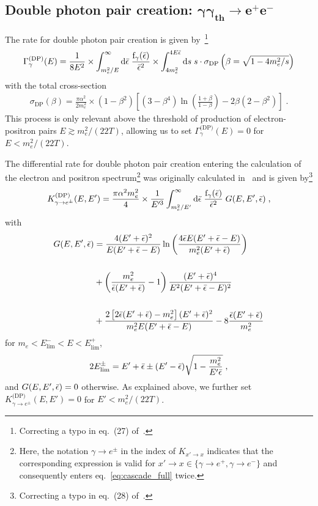 \documentclass[11pt,a4paper]{article}
\newcommand{\fpdi}{\mathrm{f}}
\newcommand{\eqsp}{\;}
\newcommand{\X}{x}
\begin{document}
\subsection*{Double photon pair creation: $\boldsymbol{\gamma \gamma_\text{th} \rightarrow e^+ e^-}$}
The rate for double photon pair creation is given by~\cite{Kawasaki:1994sc}\footnote{Correcting a typo in eq.~(27) of~\cite{Kawasaki:1994sc}.}
\begin{align}
\Gamma_\gamma^\text{(DP)}(E) = \frac{1}{8E^2}\times \int_{m_e^2/E}^{\infty} \text{d}\be\; \frac{\fpdi_\gamma(\be)}{\be^2} \times \int_{4m_e^2}^{4E\be} \text{d}s\;s\cdot\sigma_\text{DP}\left(\beta = \sqrt{1 - 4m_e^2/s}\right)
\end{align}
with the total cross-section
\begin{align}
\sigma_\text{DP}(\beta) = \frac{\pi\alpha^2}{2 m_e^2} \times (1-\beta^2)\left[ (3-\beta^4)\ln\left( \frac{1+\beta}{1-\beta} \right) - 2\beta \left( 2 - \beta^2 \right) \right]\eqsp.
\end{align}
This process is only relevant above the threshold of production of electron-positron pairs $E \gtrsim m_e^2/(22T)$, allowing us to set $\Gamma_\gamma^\text{(DP)}(E) = 0$ for $E < m_e^2/(22T)$.

The differential rate for double photon pair creation entering the calculation of the electron and positron spectrum\footnote{Here, the notation $\gamma \rightarrow e^\pm$ in the index of $K_{\X' \rightarrow \X}$ indicates that the corresponding expression is valid for $\X' \rightarrow \X \in \{\gamma \rightarrow e^+, \gamma \rightarrow e^-\}$ and consequently enters eq.~\eqref{eq:cascade_full} twice.} was originally calculated in~\cite{1983Afz....19..323A} and is given by\footnote{Correcting a typo in eq.~(28) of~\cite{Kawasaki:1994sc}.}
\begin{align}
K_{\gamma \rightarrow e^\pm}^\text{(DP)}(E, E') = \frac{\pi\alpha^2 m_e^2}{4} \times \frac{1}{E'^3}\int_{m_e^2/E'}^{\infty} \text{d}\be\;\frac{\fpdi_\gamma(\be)}{\be^2}\;G(E, E', \be)\eqsp,
\end{align}
with
\begin{align}
G(E, E', \bar{\epsilon}) & = \frac{4(E' + \bar{\epsilon})^2}{E(E' + \bar{\epsilon} - E)}\ln\left( \frac{4\bar{\epsilon} E (E' + \bar{\epsilon} - E)}{m_e^2(E' + \bar{\epsilon})} \right) \nonumber \\ \nonumber \\
& + \left( \frac{m_e^2}{\bar{\epsilon} (E' + \bar{\epsilon})} - 1 \right)\frac{(E'+\bar{\epsilon})^4}{E^2(E' + \bar{\epsilon} - E)^2} \nonumber \\ \nonumber \\
& + \frac{2\left[ 2\bar{\epsilon} (E' + \bar{\epsilon}) -m_e^2 \right](E'+\bar{\epsilon})^2}{m_e^2 E (E' + \bar{\epsilon} - E)} - 8\frac{\bar{\epsilon} (E'+\bar{\epsilon})}{m_e^2}
\end{align}
for $m_e < E_\text{lim}^- < E < E_\text{lim}^+$,
\begin{align}
2E_\text{lim}^\pm = E'+\be \pm (E'-\be)\sqrt{1- \frac{m_e^2}{E'\be}}\eqsp,
\end{align}
and $G(E, E', \bar{\epsilon}) = 0$ otherwise. As explained above, we further set $K_{\gamma \rightarrow e^\pm}^\text{(DP)}(E, E') = 0$ for $E' < m_e^2/(22T)$.
\end{document}
